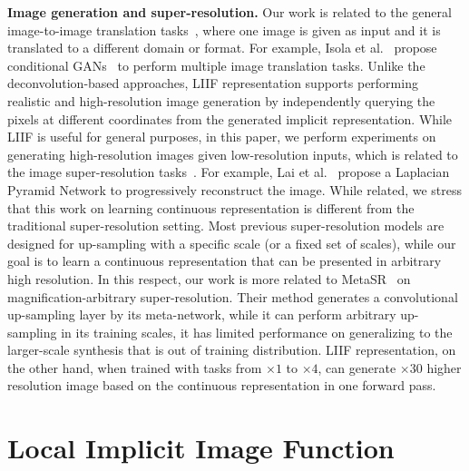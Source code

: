 \documentclass[final]{cvpr}
\begin{document}
\textbf{Image generation and super-resolution.} Our work is related to the general image-to-image translation tasks~\cite{zhang2016colorful,pix2pix2017,zhu2017unpaired,hoffman2018cycada,denton2015deep}, where one image is given as input and it is translated to a different domain or format. For example, Isola et al.~\cite{pix2pix2017} propose conditional GANs~\cite{goodfellow2014generative} to perform multiple image translation tasks. Unlike the deconvolution-based approaches, LIIF representation supports performing realistic and high-resolution image generation by independently querying the pixels at different coordinates from the generated implicit representation. While LIIF is useful for general purposes, in this paper, we perform experiments on generating high-resolution images given low-resolution inputs, which is related to the image super-resolution tasks~\cite{chang2004super,timofte2013anchored,tai2017memnet,dong2014learning,ledig2017photo,lim2017enhanced,lai2017deep,zhang2018residual,zhang2020deep}. For example, Lai et al.~\cite{lai2017deep} propose a Laplacian Pyramid Network to progressively reconstruct the image. While related, we stress that this work on learning continuous representation is different from the traditional super-resolution setting. Most previous super-resolution models are designed for up-sampling with a specific scale (or a fixed set of scales), while our goal is to learn a continuous representation that can be presented in arbitrary high resolution. In this respect, our work is more related to MetaSR~\cite{hu2019meta} on magnification-arbitrary super-resolution. Their method generates a convolutional up-sampling layer by its meta-network, while it can perform arbitrary up-sampling in its training scales, it has limited performance on generalizing to the larger-scale synthesis that is out of training distribution. LIIF representation, on the other hand, when trained with tasks from $\times 1$ to $\times 4$, can generate $\times 30$ higher resolution image based on the continuous representation in one forward pass.

\section{Local Implicit Image Function}
\end{document}
